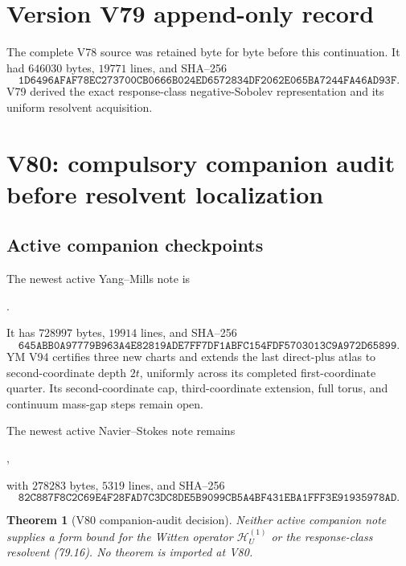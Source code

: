 \documentclass[11pt]{article}
\newtheorem{theorem}{Theorem}[section]
\theoremstyle{remark}
\begin{document}
\section*{Version V79 append-only record}
The complete V78 source was retained byte for byte before this
continuation.  It had \(646030\) bytes, \(19771\) lines, and SHA--256
\[
 \texttt{1D6496AFAF78EC273700CB0666B024ED6572834DF2062E065BA7244FA46AD93F}.
\]
V79 derived the exact response-class negative-Sobolev representation
and its uniform resolvent acquisition.


\section{V80: compulsory companion audit before resolvent localization}
\label{sec:v17v80}

\subsection{Active companion checkpoints}

The newest active Yang--Mills note is
\begin{center}\small
{}.
\end{center}
It has \(728997\) bytes, \(19914\) lines, and SHA--256
\[
 \texttt{645ABB0A97779B963A4E82819ADE7FF7DF1ABFC154FDF5703013C9A972D65899}.
                                                               \tag{80.1}
\]
YM V94 certifies three new charts and extends the last direct-plus
atlas to second-coordinate depth \(2t\), uniformly across its completed
first-coordinate quarter.  Its second-coordinate cap, third-coordinate
extension, full torus, and continuum mass-gap steps remain open.

The newest active Navier--Stokes note remains
\begin{center}\small
{},
\end{center}
with \(278283\) bytes, \(5319\) lines, and SHA--256
\[
 \texttt{82C887F8C2C69E4F28FAD7C3DC8DE5B9099CB5A4BF431EBA1FFF3E91935978AD}.
                                                               \tag{80.2}
\]

\begin{theorem}[V80 companion-audit decision]
\label{thm:v17v80-decision}
Neither active companion note supplies a form bound for the Witten
operator \(\mathscr H_U^{(1)}\) or the response-class resolvent
(79.16).  No theorem is imported at V80.
\end{theorem}
\end{document}
